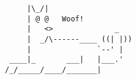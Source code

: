 \documentclass[a4paper, 12pt]{article}
\begin{document}
\vfill

\centering
\begin{BVerbatim}
     |\_/|                  
     | @ @   Woof! 
     |   <>              _  
     |  _/\------____ ((| |))
     |               `--' |   
 ____|_       ___|   |___.' 
/_/_____/____/_______|
\end{BVerbatim}

\vspace{12mm}
\end{document}
